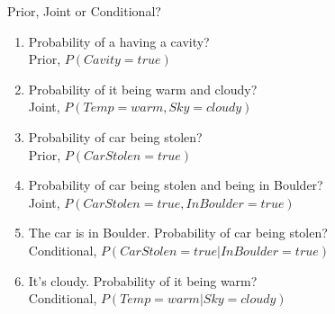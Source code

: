 \documentclass[14pt]{beamer}
\begin{document}
\begin{frame}{Prior, Joint or Conditional?}
\begin{enumerate}
\item Probability of a having a cavity? \\
\pause Prior, $P(\textit{Cavity}=\textit{true})$
\pause
\item Probability of it being warm and cloudy? \\
\pause Joint, $P(\textit{Temp}=\textit{warm}, \textit{Sky}=\textit{cloudy})$
\pause
\item Probability of car being stolen? \\
\pause Prior, $P(\textit{CarStolen}=\textit{true})$
\pause
\item Probability of car being stolen and being in Boulder? \\
\pause Joint, $P(\textit{CarStolen}=\textit{true}, \textit{InBoulder}=\textit{true})$
\pause
\item The car is in Boulder. Probability of car being stolen? \\
\pause Conditional, $P(\textit{CarStolen}=\textit{true}|\textit{InBoulder}=\textit{true})$
\pause
\item It's cloudy. Probability of it being warm? \\
\pause Conditional, $P(\textit{Temp}=\textit{warm}| \textit{Sky}=\textit{cloudy})$
\end{enumerate}
\end{frame}
\end{document}
